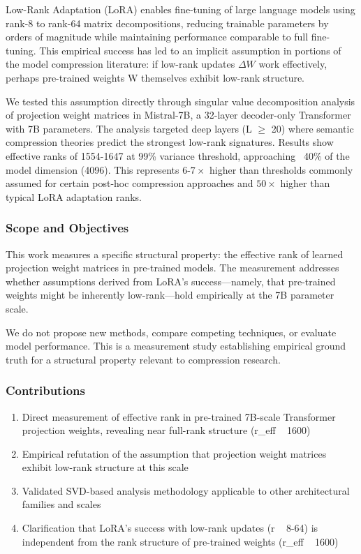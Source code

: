 
Low-Rank Adaptation (LoRA) enables fine-tuning of large language models using rank-8 to rank-64 matrix decompositions, reducing trainable parameters by orders of magnitude while maintaining performance comparable to full fine-tuning. This empirical success has led to an implicit assumption in portions of the model compression literature: if low-rank updates $\Delta W$ work effectively, perhaps pre-trained weights W themselves exhibit low-rank structure.

We tested this assumption directly through singular value decomposition analysis of projection weight matrices in Mistral-7B, a 32-layer decoder-only Transformer with 7B parameters. The analysis targeted deep layers (L $\geq$ 20) where semantic compression theories predict the strongest low-rank signatures. Results show effective ranks of 1554-1647 at 99\% variance threshold, approaching ~40\% of the model dimension (4096). This represents 6-$7\times$ higher than thresholds commonly assumed for certain post-hoc compression approaches and $50\times$ higher than typical LoRA adaptation ranks.

\subsubsection{Scope and Objectives}

This work measures a specific structural property: the effective rank of learned projection weight matrices in pre-trained models. The measurement addresses whether assumptions derived from LoRA's success---namely, that pre-trained weights might be inherently low-rank---hold empirically at the 7B parameter scale.

We do not propose new methods, compare competing techniques, or evaluate model performance. This is a measurement study establishing empirical ground truth for a structural property relevant to compression research.

\subsubsection{Contributions}

\begin{enumerate}
\item Direct measurement of effective rank in pre-trained 7B-scale Transformer projection weights, revealing near full-rank structure (r\_eff ~ 1600)
\item Empirical refutation of the assumption that projection weight matrices exhibit low-rank structure at this scale
\item Validated SVD-based analysis methodology applicable to other architectural families and scales
\item Clarification that LoRA's success with low-rank updates (r ~ 8-64) is independent from the rank structure of pre-trained weights (r\_eff ~ 1600)
\end{enumerate}
